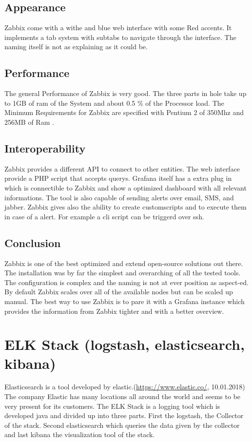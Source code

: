 \subsection{Appearance}%
Zabbix come with a withe and blue web interface with some Red accents. It implements a tab system with subtabs to navigate through the interface. The naming itself is not as explaining as it could be.  
\subsection{Performance}
The general Performance of Zabbix is very good. The three parts in hole take up to 1GB of ram of the System and about 0.5 \% of the Processor load. The Minimum Requirements for Zabbix are specified with Pentium 2 of 350Mhz and 256MB of Ram \cite{Marik2014}.
\subsection{Interoperability}
Zabbix provides a different API to connect to other entities. The web interface  provide a PHP script that accepts querys. Grafana itself has a extra plug in which is connectible to Zabbix and show a optimized dashboard with all relevant informations. The tool is also capable of sending alerts over email, SMS, and jabber. Zabbix gives also the ability to create customscripts and to execute them in case of a alert. For example a cli script can be triggerd over ssh. 
\subsection{Conclusion}
Zabbix is one of the best optimized and extend open-source solutions out there. The installation was by far the simplest and overarching of all the tested tools. The configuration is complex and the naming is not at ever position as aspect-ed. By default Zabbix scales over all of the available nodes but can be scaled up manual. The best way to use Zabbix is to pare it with a Grafana instance which provides the information from Zabbix tighter and with a better overview.

\section{ELK Stack (logstash, elasticsearch, kibana)}
\label{elk} %
Elasticsearch is a tool developed by elastic.(\url{https://www.elastic.co/}, 10.01.2018) The company Elastic has many locations all around the world and seems to be very present for its customers.
The ELK Stack is a logging tool which is developed java and divided up into three parts. First the logstash, the Collector of the stack. Second elasticsearch which queries the data given by the collector and last kibana the visualization tool of the stack.
